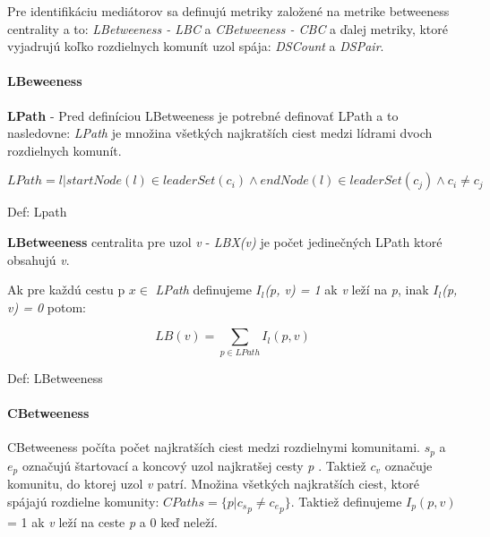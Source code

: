 \documentclass[slovak,master,public,dept460,male,cpdeclaration,oneside]{diploma}
\begin{document}
Pre identifikáciu mediátorov sa definujú metriky založené na metrike betweeness centrality a to:  \textit{LBetweeness - LBC} a \textit{CBetweeness - CBC} a ďalej metriky, ktoré vyjadrujú koľko rozdielnych komunít uzol spája: \textit{DSCount} a \textit{DSPair}.


\paragraph{LBeweeness}
\hfill \break
\textbf{LPath} - Pred definíciou LBetweeness je potrebné definovať LPath a to nasledovne: \textit{LPath} je množina všetkých najkratších ciest medzi lídrami dvoch rozdielnych komunít. 


\begin{mycapequ}[!ht]
   \begin{equation*}
     LPath = { l|startNode(l) \in  leaderSet(c_{i})\wedge endNode(l) \in leaderSet(c_{j}) \wedge c_{i}\neq c_{j} }
   \end{equation*}
   \caption{Def: Lpath}
\end{mycapequ}



{\setlength{\parindent}{0cm}
\begin{sloppypar}
\textbf{LBetweeness} centralita pre uzol \textit{v} - \textit{LBX(v)} je počet jedinečných LPath ktoré obsahujú \textit{v}. 


Ak pre každú cestu p  ${x \in}$ \textit{LPath} definujeme \textit{${I_l}$(p, v) = 1} ak \textit{v} leží na \textit{p}, inak \textit{${I_l}$(p, v) = 0} potom:
\end{sloppypar}
}
 
\begin{mycapequ}[!ht]
   \begin{equation*}
     LB(v) = \sum_{p \in LPath} I_{l}(p, v)
   \end{equation*}
   \caption{Def: LBetweeness}
\end{mycapequ}


\paragraph{CBetweeness}
\hfill \break
CBetweeness počíta počet najkratších ciest medzi rozdielnymi komunitami. \textit{${s_p}$} a \textit{${e_p}$} označujú štartovací a koncový uzol najkratšej cesty \textit{p} . Taktiež \textit{${c_v}$} označuje komunitu, do ktorej uzol \textit{v} patrí. Množina všetkých najkratších ciest, ktoré spájajú rozdielne komunity:  
\textit{${CPaths = \{ p | {c_s}_p \neq {c_e}_p} \}$}. Taktiež definujeme ${I_p(p, v)}$ = 1 ak \textit{v} leží na ceste \textit{p} a 0 keď neleží.
\end{document}

